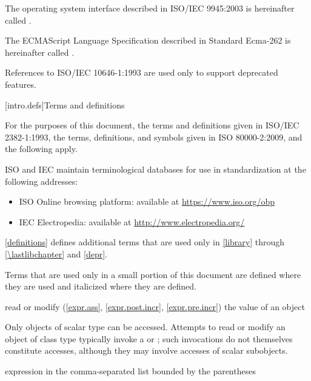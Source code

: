 \pnum
The operating system interface described in ISO/IEC 9945:2003 is
hereinafter called .

\pnum
The ECMAScript Language Specification described in Standard Ecma-262 is
hereinafter called .

\pnum
\begin{note}
References to ISO/IEC 10646-1:1993 are used only
to support deprecated features.
\end{note}

[intro.defs]{Terms and definitions}

\pnum
{}%
For the purposes of this document,
the terms and definitions
given in ISO/IEC 2382-1:1993,
the terms, definitions, and symbols
given in ISO 80000-2:2009,
and the following apply.

\pnum
ISO and IEC maintain terminological databases
for use in standardization
at the following addresses:
\begin{itemize}
\item ISO Online browsing platform: available at \url{https://www.iso.org/obp}
\item IEC Electropedia: available at \url{http://www.electropedia.org/}
\end{itemize}

\pnum
\ref{definitions}
defines additional terms that are used only in \ref{library}
through \ref{\lastlibchapter} and \ref{depr}.

\pnum
Terms that are used only in a small portion of this document
are defined where they are used and italicized where they are
defined.

%
read or
modify (\ref{expr.ass}, \ref{expr.post.incr}, \ref{expr.pre.incr})
the value of an object

\begin{defnote}
Only objects of scalar type can be accessed.
Attempts to read or modify an object of class type
typically invoke a 
or ;
such invocations do not themselves constitute accesses,
although they may involve accesses of scalar subobjects.
\end{defnote}

%
 expression in the
comma-separated list bounded by the parentheses

